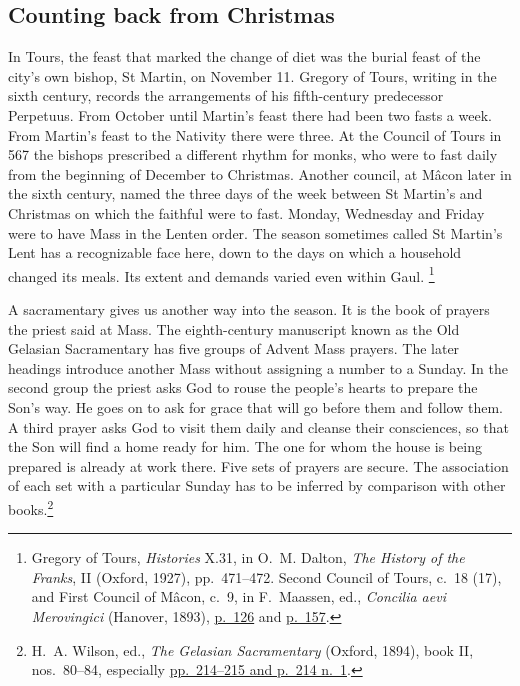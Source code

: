 \subsection{Counting back from Christmas}

In Tours, the feast that marked the change of diet was the burial feast of the
city's own bishop, St Martin, on November 11. Gregory of Tours, writing in the
sixth century, records the arrangements of his fifth-century predecessor
Perpetuus. From October until Martin's feast there had been two fasts a week.
From Martin's feast to the Nativity there were three. At the Council of Tours
in 567 the bishops prescribed a different rhythm for monks, who were to fast
daily from the beginning of December to Christmas. Another council, at Mâcon
later in the sixth century, named the three days of the week between St
Martin's and Christmas on which the faithful were to fast. Monday, Wednesday
and Friday were to have Mass in the Lenten order. The season sometimes called
St Martin's Lent has a recognizable face here, down to the days on which a
household changed its meals. Its extent and demands varied even within Gaul.
\footnote{Gregory of Tours, \emph{Histories} X.31, in O.~M. Dalton,
\emph{The History of the Franks}, II (Oxford, 1927), pp.~471--472.
Second Council of Tours, c.~18 (17), and First Council of Mâcon, c.~9,
in F.~Maassen, ed., \emph{Concilia aevi Merovingici} (Hanover, 1893),
\href{https://www.dmgh.de/mgh_conc_1/index.htm\#page/126/mode/1up}{p.~126}
and \href{https://www.dmgh.de/mgh_conc_1/index.htm\#page/157/mode/1up}{p.~157}.}

A sacramentary gives us another way into the season. It is the book of
prayers the priest said at Mass. The eighth-century manuscript known as the
Old Gelasian Sacramentary has five groups of Advent Mass prayers. The later
headings introduce another Mass without assigning a number to a Sunday.
In the second group the priest asks God to rouse the people's hearts to
prepare the Son's way. He goes on to ask for grace that will go before them
and follow them. A third prayer asks God to visit them daily and cleanse their
consciences, so that the Son will find a home ready for him. The one for whom
the house is being prepared is already at work there. Five sets of prayers are
secure. The association of each set with a particular Sunday has to be
inferred by comparison with other books.\footnote{H.~A. Wilson, ed.,
\emph{The Gelasian Sacramentary} (Oxford, 1894), book II, nos.~80--84,
especially \href{https://archive.org/details/LiberSacramentorumRomanaeEcclesiae}{pp.~214--215 and p.~214 n.~1}.}

